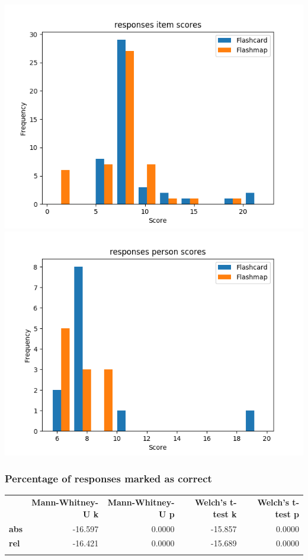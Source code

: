 \documentclass[]{article}
\begin{document}
\includegraphics{responses_diff.png}
\includegraphics{responses_abil.png}

\subsubsection{Percentage of responses marked as
correct}\label{percentage-of-responses-marked-as-correct-1}

\begin{longtable}[c]{@{}lrrrr@{}}
\toprule\addlinespace
& \textbf{Mann-Whitney-U k} & \textbf{Mann-Whitney-U p} &
\textbf{Welch's t-test k} & \textbf{Welch's t-test p}
\\\addlinespace
\midrule\endhead
\textbf{abs} & -16.597 & 0.0000 & -15.857 & 0.0000
\\\addlinespace
\textbf{rel} & -16.421 & 0.0000 & -15.689 & 0.0000
\\\addlinespace
\bottomrule
\end{longtable}
\end{document}
